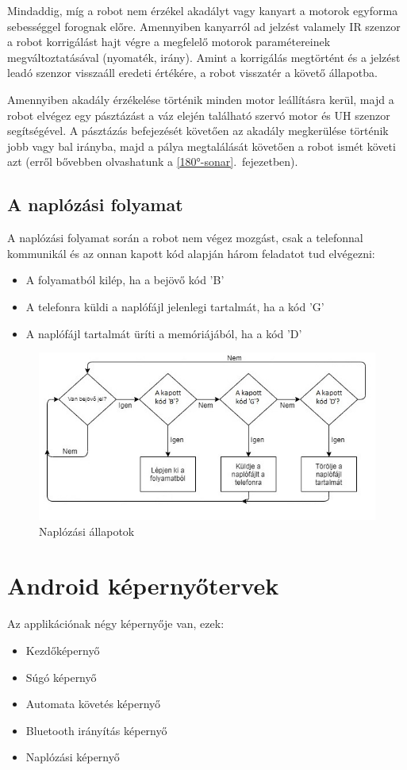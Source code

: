 \documentclass[]{thesis-ekf}
\theoremstyle{definition}
\begin{document}
Mindaddig, míg a robot nem érzékel akadályt vagy kanyart a motorok egyforma sebességgel forognak előre. Amennyiben kanyarról ad jelzést valamely IR szenzor a robot korrigálást hajt végre a megfelelő motorok paramétereinek megváltoztatásával (nyomaték, irány). Amint a korrigálás megtörtént és a jelzést leadó szenzor visszaáll eredeti értékére, a robot visszatér a követő állapotba.

Amennyiben akadály érzékelése történik minden motor leállításra kerül, majd a robot elvégez egy pásztázást a váz elején található szervó motor és UH szenzor segítségével. A pásztázás befejezését követően az akadály megkerülése történik jobb vagy bal irányba, majd a pálya megtalálását követően a robot ismét követi azt (erről bővebben olvashatunk a \ref{180°-sonar}.~fejezetben).
\subsection{A naplózási folyamat}\label{naplokepernyo_allapot}
A naplózási folyamat során a robot nem végez mozgást, csak a telefonnal kommunikál és az onnan kapott kód alapján három feladatot tud elvégezni:
\begin{itemize}
	\item A folyamatból kilép, ha a bejövő kód 'B'
	\item A telefonra küldi a naplófájl jelenlegi tartalmát, ha a kód 'G'
	\item A naplófájl tartalmát üríti a memóriájából, ha a kód 'D'
\end{itemize}
\begin{figure}[h]
	\centering
	\includegraphics[width=\columnwidth]{images/grafok/log_graf}
	\caption{Naplózási állapotok}
	\label{log_graf}
\end{figure}
\section{Android képernyőtervek}
Az applikációnak négy képernyője van, ezek:
\begin{itemize}
	\item Kezdőképernyő
	\item Súgó képernyő
	\item Automata követés képernyő
	\item Bluetooth irányítás képernyő
	\item Naplózási képernyő
\end{itemize}
\end{document}
